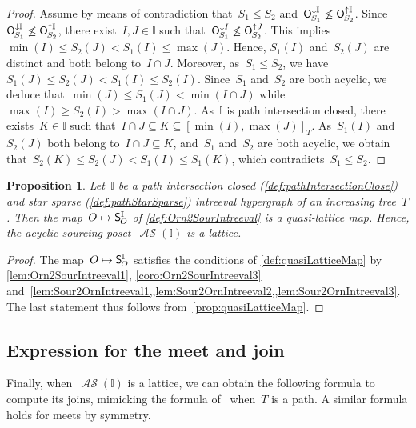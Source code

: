 \documentclass{amsart}
\newtheorem{proposition}[theorem]{Proposition}
\theoremstyle{definition}
\newcommand{\mymap}[2]{\mathsf{#1}_{\hspace{-.7pt}#2}}
\newcommand{\minorn}[2]{\mymap{O}{#1}^{\downarrow#2}}  %
\newcommand{\maxorn}[2]{\mymap{O}{#1}^{\uparrow#2}}  %
\newcommand{\sour}[1]{\mymap{S}{#1}}  %
\DeclareMathOperator{\ASour}{\mathcal{AS}}  %
\newcommand{\II}{\mathbb I} %
\begin{document}
\begin{proof}
Assume by means of contradiction that~$S_1 \le S_2$ and~$\minorn{S_1}{\II} \not\le \maxorn{S_2}{\II}$.
Since~$\minorn{S_1}{\II} \not\le \maxorn{S_2}{\II}$, there exist~$I, J \in \II$ such that~$\minorn{S_1}{I} \not\le \maxorn{S_2}{J}$.
This implies~$\min(I) \le S_2(J) < S_1(I) \le \max(J)$.
Hence, $S_1(I)$ and~$S_2(J)$ are distinct and both belong to~$I \cap J$.
Moreover, as~$S_1 \le S_2$, we have~$S_1(J) \le S_2(J) < S_1(I) \le S_2(I)$.
Since~$S_1$ and~$S_2$ are both acyclic, we deduce that~$\min(J) \le S_1(J) < \min(I \cap J)$ while~$\max(I) \ge S_2(I) > \max(I \cap J)$.
As~$\II$ is path intersection closed, there exists~$K \in \II$ such that~$I \cap J \subseteq K \subseteq [\min(I) , \max(J)]_T$.
As~$S_1(I)$ and~$S_2(J)$ both belong to~$I \cap J \subseteq K$, and~$S_1$ and~$S_2$ are both acyclic, we obtain that~$S_2(K) \le S_2(J) < S_1(I) \le S_1(K)$, which contradicts~$S_1 \le S_2$.
\end{proof}

\begin{proposition}
\label{prop:quasiLatticeMapIntreevalLattices}
Let~$\II$ be a path intersection closed (\cref{def:pathIntersectionClose}) and star sparse (\cref{def:pathStarSparse}) intreeval hypergraph of an increasing tree~$T$.
Then the map~$O \mapsto \sour{O}^\II$ of \cref{def:Orn2SourIntreeval} is a quasi-lattice map.
Hence, the acyclic sourcing poset~$\ASour(\II)$ is a lattice.
\end{proposition}

\begin{proof}
The map~$O \mapsto \sour{O}^\II$ satisfies the conditions of \cref{def:quasiLatticeMap} by \cref{lem:Orn2SourIntreeval1}, \cref{coro:Orn2SourIntreeval3} and~\cref{lem:Sour2OrnIntreeval1,,lem:Sour2OrnIntreeval2,,lem:Sour2OrnIntreeval3}.
The last statement thus follows from~\cref{prop:quasiLatticeMap}.
\end{proof}


\subsection{Expression for the meet and join}
\label{subsec:formulaMeetJoin}

Finally, when~$\ASour(\II)$ is a lattice, we can obtain the following formula to compute its joins, mimicking the formula of~\cite[Prop.~4.15]{BergeronPilaud} when~$T$ is a path.
A similar formula holds for meets by symmetry.
\end{document}

